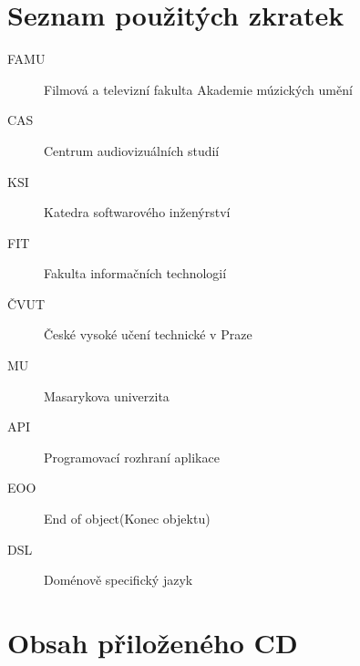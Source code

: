 \documentclass[thesis=B,czech]{FITthesis}[2012/06/26]
\begin{document}
\appendix

\chapter{Seznam použitých zkratek}
\begin{description}
	\item[FAMU] Filmová a televizní fakulta Akademie múzických umění
	\item[CAS] Centrum audiovizuálních studií
	\item[KSI] Katedra softwarového inženýrství
	\item[FIT] Fakulta informačních technologií
	\item[ČVUT] České vysoké učení technické v Praze
	\item[MU] Masarykova univerzita
	\item[API] Programovací rozhraní aplikace
	\item[EOO] End of object(Konec objektu)
	\item[DSL] Doménově specifický jazyk
\end{description}


\chapter{Obsah přiloženého CD}

\begin{figure}
\end{figure}
\end{document}
